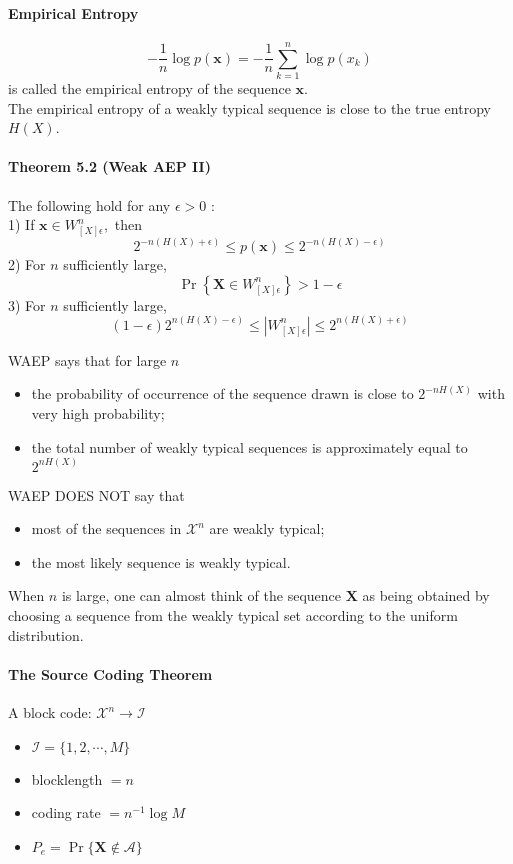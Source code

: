 \documentclass[8pt]{article}
\begin{document}
\paragraph{Empirical Entropy}
$$
-\frac{1}{n} \log p(\mathbf{x})=-\frac{1}{n} \sum_{k=1}^{n} \log p\left(x_{k}\right)
$$
is called the empirical entropy of the sequence $\mathbf{x}$. \\
The empirical entropy of a weakly typical sequence is close to the true entropy $H(X)$.

\begin{tcolorbox}
\paragraph{Theorem 5.2 (Weak AEP II)} The following hold for any $\epsilon>0$ :\\
1) If $\mathbf{x} \in W_{[X] \epsilon}^{n},$ then
$$
2^{-n(H(X)+\epsilon)} \leq p(\mathbf{x}) \leq 2^{-n(H(X)-\epsilon)}
$$
2) For $n$ sufficiently large,
$$
\operatorname{Pr}\left\{\mathbf{X} \in W_{[X] \epsilon}^{n}\right\}>1-\epsilon
$$
3) For $n$ sufficiently large,
$$
(1-\epsilon) 2^{n(H(X)-\epsilon)} \leq\left|W_{[X] \epsilon}^{n}\right| \leq 2^{n(H(X)+\epsilon)}
$$
\end{tcolorbox}

\noindent WAEP says that for large $n$
\begin{itemize}
	\item the probability of occurrence of the sequence drawn is close to $2^{-n H(X)}$ with very high probability;
	\item the total number of weakly typical sequences is approximately equal to $2^{n H(X)}$
\end{itemize}
\noindent WAEP DOES NOT say that
\begin{itemize}
	\item most of the sequences in $\mathcal{X}^{n}$ are weakly typical;
	\item the most likely sequence is weakly typical.
\end{itemize}
When $n$ is large, one can almost think of the sequence $\mathbf{X}$ as being obtained by choosing a sequence from the weakly typical set according to the uniform distribution.

\paragraph{The Source Coding Theorem} A block code: $\mathcal{X}^{n} \rightarrow \mathcal{I}$
\begin{itemize}
	\item $\mathcal{I}=\{1,2, \cdots, M\}$
	\item blocklength $=n$
	\item coding rate $=n^{-1} \log M$
	\item $P_{e}=\operatorname{Pr}\{\mathbf{X} \notin \mathcal{A}\}$
\end{itemize}
\end{document}
